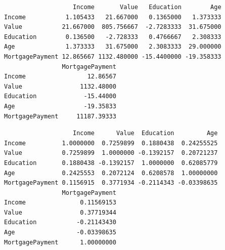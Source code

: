 \begin{Shaded}
\begin{Highlighting}[]
\end{Highlighting}
\end{Shaded}

\begin{verbatim}
                   Income       Value   Education        Age
Income           1.105433   21.667000   0.1365000   1.373333
Value           21.667000  805.756667  -2.7283333  31.675000
Education        0.136500   -2.728333   0.4766667   2.308333
Age              1.373333   31.675000   2.3083333  29.000000
MortgagePayment 12.865667 1132.480000 -15.4400000 -19.358333
                MortgagePayment
Income                 12.86567
Value                1132.48000
Education             -15.44000
Age                   -19.35833
MortgagePayment     11187.39333
\end{verbatim}

\begin{Shaded}
\begin{Highlighting}[]
\end{Highlighting}
\end{Shaded}

\begin{verbatim}
                   Income      Value  Education         Age
Income          1.0000000  0.7259899  0.1880438  0.24255525
Value           0.7259899  1.0000000 -0.1392157  0.20721237
Education       0.1880438 -0.1392157  1.0000000  0.62085779
Age             0.2425553  0.2072124  0.6208578  1.00000000
MortgagePayment 0.1156915  0.3771934 -0.2114343 -0.03398635
                MortgagePayment
Income               0.11569153
Value                0.37719344
Education           -0.21143430
Age                 -0.03398635
MortgagePayment      1.00000000
\end{verbatim}

\begin{Shaded}
\begin{Highlighting}[]


\NormalTok{(}
\NormalTok{  , } 
\NormalTok{  , } 
\NormalTok{  , } 
\NormalTok{  , } 
\NormalTok{  , } 
\NormalTok{  , } 
\NormalTok{  , } 
\NormalTok{  , } 
\NormalTok{  , } 
\NormalTok{  , }
\NormalTok{)}
\end{Highlighting}
\end{Shaded}

